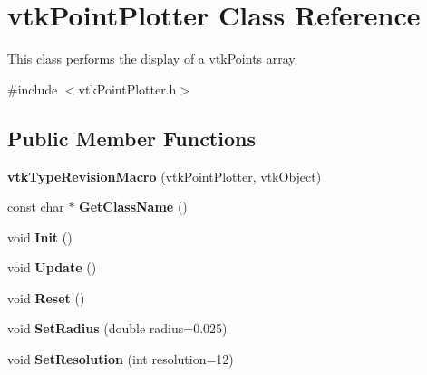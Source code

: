 \hypertarget{classvtkPointPlotter}{
\section{vtkPointPlotter Class Reference}
\label{classvtkPointPlotter}
}


This class performs the display of a vtkPoints array.  




{\ttfamily \#include $<$vtkPointPlotter.h$>$}

\subsection*{Public Member Functions}
\begin{DoxyCompactItemize}
\item 
\hypertarget{classvtkPointPlotter_a0708c3a731b70235238305fcec788c9d}{
{\bfseries vtkTypeRevisionMacro} (\hyperlink{classvtkPointPlotter}{vtkPointPlotter}, vtkObject)}
\label{classvtkPointPlotter_a0708c3a731b70235238305fcec788c9d}

\item 
\hypertarget{classvtkPointPlotter_a864e9ad3ebcaae4b6fdedc4c0e666b7b}{
const char $\ast$ {\bfseries GetClassName} ()}
\label{classvtkPointPlotter_a864e9ad3ebcaae4b6fdedc4c0e666b7b}

\item 
\hypertarget{classvtkPointPlotter_a28f6777816c31f9a6934bb7149348e78}{
void {\bfseries Init} ()}
\label{classvtkPointPlotter_a28f6777816c31f9a6934bb7149348e78}

\item 
\hypertarget{classvtkPointPlotter_a086fd3ddc932a01f59596e57e7b80845}{
void {\bfseries Update} ()}
\label{classvtkPointPlotter_a086fd3ddc932a01f59596e57e7b80845}

\item 
\hypertarget{classvtkPointPlotter_a16ab58e612f50555ff575f2b4f00de63}{
void {\bfseries Reset} ()}
\label{classvtkPointPlotter_a16ab58e612f50555ff575f2b4f00de63}

\item 
\hypertarget{classvtkPointPlotter_aeb9ea6d9211adbe11a7acf45ae092a96}{
void {\bfseries SetRadius} (double radius=0.025)}
\label{classvtkPointPlotter_aeb9ea6d9211adbe11a7acf45ae092a96}

\item 
\hypertarget{classvtkPointPlotter_a1e5c27a0311f5955437ba75ea61b9f3d}{
void {\bfseries SetResolution} (int resolution=12)}
\label{classvtkPointPlotter_a1e5c27a0311f5955437ba75ea61b9f3d}


\end{DoxyCompactItemize}
